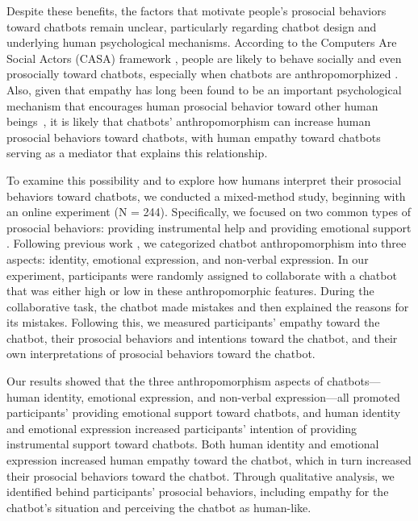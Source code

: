 Despite these benefits, the factors that motivate people’s prosocial behaviors toward chatbots remain unclear, particularly regarding chatbot design and underlying human psychological mechanisms. According to the Computers Are Social Actors (CASA) framework \cite{nass_CASA, nass_mindlessness}, people are likely to behave socially and even prosocially toward chatbots, especially when chatbots are anthropomorphized \cite{NIELSEN2022260}. Also, given that empathy has long been found to be an important psychological mechanism that encourages human prosocial behavior toward other human beings~\cite {eisenberg2002empathy, Eisenberg1987, OLIVEIRA2021106547}, it is likely that chatbots' anthropomorphism can increase human prosocial behaviors toward chatbots, with human empathy toward chatbots serving as a mediator that explains this relationship.




To examine this possibility and to explore how humans interpret their prosocial behaviors toward chatbots, we conducted a mixed-method study, beginning with an online experiment (N = 244). Specifically, we focused on two common types of prosocial behaviors: providing instrumental help and providing emotional support \cite{OLIVEIRA2021106547, NIELSEN2022260}. Following previous work \cite{seeger2018designing}, we categorized chatbot anthropomorphism into three aspects: identity, emotional expression, and non-verbal expression. In our experiment, participants were randomly assigned to collaborate with a chatbot that was either high or low in these anthropomorphic features. During the collaborative task, the chatbot made mistakes and then explained the reasons for its mistakes. Following this, we measured participants’ empathy toward the chatbot, their prosocial behaviors and intentions toward the chatbot, and their own interpretations of prosocial behaviors toward the chatbot.



Our results showed that the three anthropomorphism aspects of chatbots—human identity, emotional expression, and non-verbal expression—all promoted participants’ providing emotional support toward chatbots, and human identity and emotional expression increased participants' intention of providing instrumental support toward chatbots. Both human identity and emotional expression increased human empathy toward the chatbot, which in turn increased their prosocial behaviors toward the chatbot. Through qualitative analysis, we identified  behind participants’ prosocial behaviors, including empathy for the chatbot’s situation and perceiving the chatbot as human-like.




